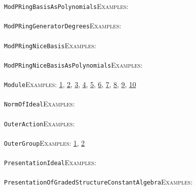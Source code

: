\documentclass[a4paper,11pt]{report}
\begin{document}
{{ \texttt{ModPRingBasisAsPolynomials}{\nobreakspace}{\nobreakspace}{\nobreakspace}{\nobreakspace}\textsc{Examples:} \\
 \\
 \texttt{ModPRingGeneratorDegrees}{\nobreakspace}{\nobreakspace}{\nobreakspace}{\nobreakspace}\textsc{Examples:} \\
 \\
 \texttt{ModPRingNiceBasis}{\nobreakspace}{\nobreakspace}{\nobreakspace}{\nobreakspace}\textsc{Examples:} \\
 \\
 \texttt{ModPRingNiceBasisAsPolynomials}{\nobreakspace}{\nobreakspace}{\nobreakspace}{\nobreakspace}\textsc{Examples:} \\
 \\
 \texttt{Module}{\nobreakspace}{\nobreakspace}{\nobreakspace}{\nobreakspace}\textsc{Examples:} \href{tutorial/chap10.html} {1}{\nobreakspace}, \href{../www/SideLinks/About/aboutAbelianCategories.html} {2}{\nobreakspace}, \href{../www/SideLinks/About/aboutNonabelian.html} {3}{\nobreakspace}, \href{../www/SideLinks/About/aboutPeriodic.html} {4}{\nobreakspace}, \href{../www/SideLinks/About/aboutCoefficientSequence.html} {5}{\nobreakspace}, \href{../www/SideLinks/About/aboutCrossedMods.html} {6}{\nobreakspace}, \href{../www/SideLinks/About/aboutGouter.html} {7}{\nobreakspace}, \href{../www/SideLinks/About/aboutIntro.html} {8}{\nobreakspace}, \href{../www/SideLinks/About/aboutTorAndExt.html} {9}{\nobreakspace}, \href{../www/SideLinks/About/aboutTwistedCoefficients.html} {10}{\nobreakspace} \\
 \\
 \texttt{NormOfIdeal}{\nobreakspace}{\nobreakspace}{\nobreakspace}{\nobreakspace}\textsc{Examples:} \\
 \\
 \texttt{OuterAction}{\nobreakspace}{\nobreakspace}{\nobreakspace}{\nobreakspace}\textsc{Examples:} \\
 \\
 \texttt{OuterGroup}{\nobreakspace}{\nobreakspace}{\nobreakspace}{\nobreakspace}\textsc{Examples:} \href{../www/SideLinks/About/aboutCoefficientSequence.html} {1}{\nobreakspace}, \href{../www/SideLinks/About/aboutGouter.html} {2}{\nobreakspace} \\
 \\
 \texttt{PresentationIdeal}{\nobreakspace}{\nobreakspace}{\nobreakspace}{\nobreakspace}\textsc{Examples:} \\
 \\
 \texttt{PresentationOfGradedStructureConstantAlgebra}{\nobreakspace}{\nobreakspace}{\nobreakspace}{\nobreakspace}\textsc{Examples:} \\
}}
\end{document}
